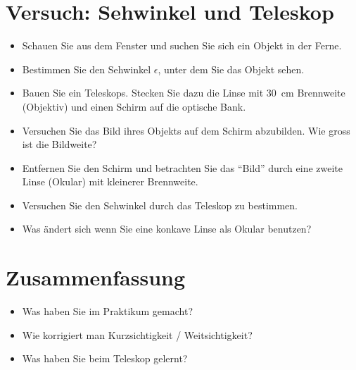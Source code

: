 \documentclass[12pt,a4paper, twosite]{article}
\begin{document}
\section*{Versuch: Sehwinkel und Teleskop}
\begin{itemize}
	\item Schauen Sie aus dem Fenster und suchen Sie sich ein Objekt in der Ferne.
	\item Bestimmen Sie den Sehwinkel $\epsilon$, unter dem Sie das Objekt sehen.
	\item Bauen Sie ein Teleskops. Stecken Sie dazu die Linse mit \SI{30}{cm} Brennweite (Objektiv) und einen Schirm auf die optische Bank.
	\item Versuchen Sie das Bild ihres Objekts auf dem Schirm abzubilden. Wie gross ist die Bildweite?
	\item Entfernen Sie den Schirm und betrachten Sie das ``Bild'' durch eine zweite Linse (Okular) mit kleinerer Brennweite.
	\item Versuchen Sie den Sehwinkel durch das Teleskop zu bestimmen.
	\item Was ändert sich wenn Sie eine konkave Linse als Okular benutzen?
\end{itemize}

\section*{Zusammenfassung}
\begin{itemize}
	\item Was haben Sie im Praktikum gemacht?
	\item Wie korrigiert man Kurzsichtigkeit / Weitsichtigkeit?
	\item Was haben Sie beim Teleskop gelernt?
\end{itemize}
\end{document}
